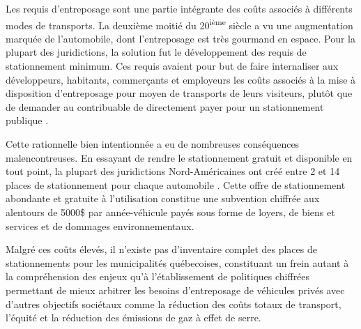 
\label{sec:Introduction}  %

Les requis d'entreposage sont une partie intégrante des coûts associés à différents modes de transports. La deuxième moitié du 20\textsuperscript{ième} siècle a vu une augmentation marquée de l'automobile, dont l'entreposage est très gourmand en espace. Pour la plupart des juridictions, la solution fut le développement des requis de stationnement minimum. Ces requis avaient pour but de faire internaliser aux développeurs, habitants, commerçants et employeurs les coûts associés à la mise à disposition d'entreposage pour moyen de transports de leurs visiteurs, plutôt que de demander au contribuable de directement payer pour un stationnement publique \parencite{Shoup:HighCost:2005}.\par

Cette rationnelle bien intentionnée a eu de nombreuses conséquences malencontreuses. En essayant de rendre le stationnement gratuit et disponible en tout point, la plupart des juridictions Nord-Américaines ont créé entre 2 et 14 places de stationnement pour chaque automobile \parencite{Scharnhorst:QuantifiedParking:2018}. Cette offre de stationnement abondante et gratuite à l'utilisation constitue une subvention chiffrée aux alentours de 5000\$ par année-véhicule \parencite{Litman:ComprehensiveParking:2023} payés sous forme de loyers,  de biens et services et de dommages environnementaux.\par

Malgré ces coûts élevés, il n'existe pas d'inventaire complet des places de stationnements pour les municipalités québecoises, constituant un frein autant à la compréhension des enjeux qu'à l'établissement de politiques chiffrées permettant de mieux arbitrer les besoins d'entreposage de véhicules privés avec d'autres objectifs sociétaux comme la réduction des coûts totaux de transport, l'équité et la réduction des émissions de gaz à effet de serre. \par



